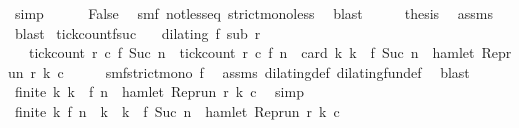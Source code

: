 \begin{isabellebody}
\ simp\isanewline
\ \ \ \ \isamarkupfalse%
\ False\ \isamarkupfalse%
\ smf\ not{\isacharunderscore}less{\isacharunderscore}eq\ strict{\isacharunderscore}mono{\isacharunderscore}less\ \isamarkupfalse%
\ blast\isanewline
\ \ \isacommand{{\isacharbraceright}}\isamarkupfalse%
\ \isamarkupfalse%
\ {\isacharquery}thesis\ \isamarkupfalse%
\ assms{\isacharparenleft}{}{\isacharparenright}\ \isamarkupfalse%
\ blast\isanewline
{}\isamarkupfalse%
%
\endisatagproof
{\isafoldproof}%
%
\isadelimproof
\isanewline
%
\endisadelimproof
\isanewline
{}\isamarkupfalse%
\ tick{\isacharunderscore}count{\isacharunderscore}fsuc{\isacharcolon}\isanewline
\ \ \ {\isacartoucheopen}dilating\ f\ sub\ r{\isacartoucheclose}\isanewline
\ \ \ {\isacartoucheopen}tick{\isacharunderscore}count\ r\ c\ {\isacharparenleft}f\ {\isacharparenleft}Suc\ n{\isacharparenright}{\isacharparenright}\ {\isacharequal}\ tick{\isacharunderscore}count\ r\ c\ {\isacharparenleft}f\ n{\isacharparenright}\ {\isacharplus}\ card\ {\isacharbraceleft}k{\isachardot}\ k\ {\isacharequal}\ f\ {\isacharparenleft}Suc\ n{\isacharparenright}\ {\isasymand}\ hamlet\ {\isacharparenleft}{\isacharparenleft}Rep{\isacharunderscore}run\ r{\isacharparenright}\ k\ c{\isacharparenright}{\isacharbraceright}{\isacartoucheclose}\isanewline
%
\isadelimproof
%
\endisadelimproof
%
\isatagproof
{}\isamarkupfalse%
\ {\isacharminus}\isanewline
\ \ \isamarkupfalse%
\ smf{\isacharcolon}{\isacartoucheopen}strict{\isacharunderscore}mono\ f{\isacartoucheclose}\ \isamarkupfalse%
\ assms\ dilating{\isacharunderscore}def\ dilating{\isacharunderscore}fun{\isacharunderscore}def\ \isamarkupfalse%
\ blast\isanewline
\ \ \isamarkupfalse%
\ \isamarkupfalse%
\ {\isacartoucheopen}finite\ {\isacharbraceleft}k{\isachardot}\ k\ {\isasymle}\ f\ n\ {\isasymand}\ hamlet\ {\isacharparenleft}{\isacharparenleft}Rep{\isacharunderscore}run\ r{\isacharparenright}\ k\ c{\isacharparenright}{\isacharbraceright}{\isacartoucheclose}\ \isamarkupfalse%
\ simp\isanewline
\ \ \isamarkupfalse%
\ \isamarkupfalse%
\ {\isacharasterisk}{\isacharcolon}{\isacartoucheopen}finite\ {\isacharbraceleft}k{\isachardot}\ f\ n\ {\isacharless}\ k\ {\isasymand}\ k\ {\isasymle}\ f\ {\isacharparenleft}Suc\ n{\isacharparenright}\ {\isasymand}\ hamlet\ {\isacharparenleft}{\isacharparenleft}Rep{\isacharunderscore}run\ r{\isacharparenright}\ k\ c{\isacharparenright}{\isacharbraceright}{\isacartoucheclose}\ \isamarkupfalse%

\end{isabellebody}
